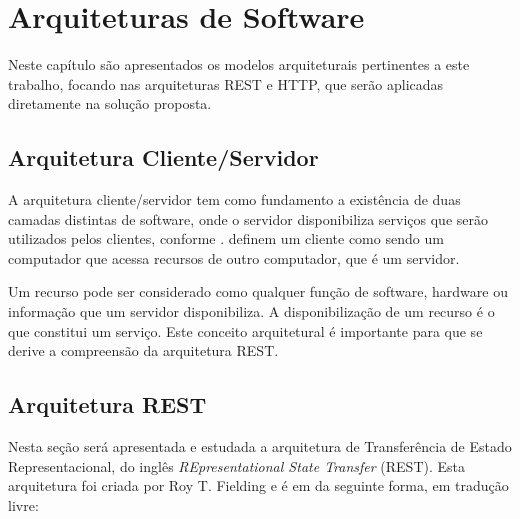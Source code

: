 \chapter{Arquiteturas de Software}
\label{chap:arquitetura}

Neste capítulo são apresentados os modelos arquiteturais pertinentes a este trabalho, focando nas arquiteturas REST e HTTP, que serão aplicadas diretamente na solução proposta.


\section{Arquitetura Cliente/Servidor}
\label{sec:arq:cli-serv}
A arquitetura cliente/servidor tem como fundamento a existência de duas camadas distintas de software, onde o servidor disponibiliza serviços que serão utilizados pelos clientes, conforme .  definem um cliente como sendo um computador que acessa recursos de outro computador, que é um servidor.


Um recurso pode ser considerado como qualquer função de software, hardware ou informação que um servidor disponibiliza. A disponibilização de um recurso é o que constitui um serviço. Este conceito arquitetural é importante para que se derive a compreensão da arquitetura REST.


\section{Arquitetura REST}

Nesta seção será apresentada e estudada a arquitetura de Transferência de Estado Representacional, do inglês \textit{REpresentational State Transfer} (REST). Esta arquitetura foi criada por Roy T. Fielding e é em \cite{FIELDING:2000} da seguinte forma, em tradução livre:

